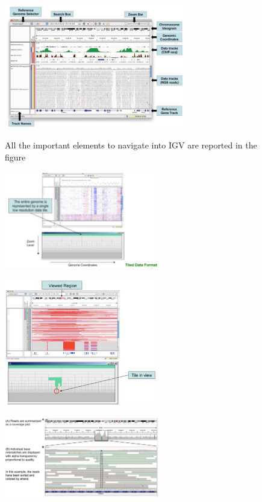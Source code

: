 \begin{figure}[H]
    \caption{All the important elements to navigate into IGV are reported in the figure}
    \centering
    \includegraphics[width=0.7\textwidth]{IGVview.PNG}
    \label{IGVnavigation}
\end{figure}
\begin{figure}[H]
    \caption{}
    \centering
    \includegraphics[width=0.6\textwidth]{Tiles.PNG}
    \label{Til}
\end{figure}
\begin{figure}[H]
    \caption{}
    \centering
    \includegraphics[width=0.6\textwidth]{TileView.PNG}
    \label{img: TileV}
\end{figure}
\begin{figure}[H]
    \caption{}
    \centering
    \includegraphics[width=0.6\textwidth]{IGVReadsView.PNG}
    \label{ViewReads}
\end{figure} 


